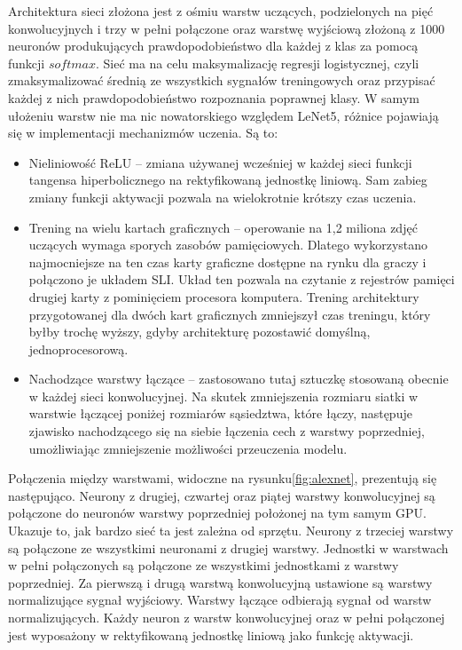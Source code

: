 \documentclass[12pt,a4paper,twoside,titlepage,openright]{book}
\begin{document}
\begin{itemize}
\begin{itemize}
 Architektura sieci złożona jest z ośmiu warstw uczących, podzielonych na pięć konwolucyjnych i trzy w pełni połączone oraz warstwę wyjściową złożoną z 1000 neuronów produkujących prawdopodobieństwo dla każdej z klas za pomocą funkcji $softmax$. Sieć ma na celu maksymalizację regresji logistycznej, czyli zmaksymalizować średnią ze wszystkich sygnałów treningowych oraz przypisać każdej z nich prawdopodobieństwo rozpoznania poprawnej klasy.
  W samym ułożeniu warstw nie ma nic nowatorskiego względem LeNet5, różnice pojawiają się w implementacji mechanizmów uczenia. Są to:
 \begin{itemize}
 \item Nieliniowość ReLU -- zmiana używanej wcześniej w każdej sieci funkcji tangensa hiperbolicznego na rektyfikowaną jednostkę liniową. Sam zabieg zmiany funkcji aktywacji pozwala na wielokrotnie krótszy czas uczenia.
 \item Trening na wielu kartach graficznych -- operowanie na 1,2 miliona zdjęć uczących wymaga sporych zasobów pamięciowych. Dlatego wykorzystano najmocniejsze na ten czas karty graficzne dostępne na rynku dla graczy i połączono je układem SLI. Układ ten pozwala na czytanie z rejestrów pamięci drugiej karty z pominięciem procesora komputera. Trening architektury przygotowanej dla dwóch kart graficznych zmniejszył czas treningu, który byłby trochę wyższy, gdyby architekturę pozostawić domyślną, jednoprocesorową.
 \item Nachodzące warstwy łączące -- zastosowano tutaj sztuczkę stosowaną obecnie w każdej sieci konwolucyjnej. Na skutek zmniejszenia rozmiaru siatki w warstwie łączącej poniżej rozmiarów sąsiedztwa, które łączy, następuje zjawisko nachodzącego się na siebie łączenia cech z warstwy poprzedniej, umożliwiając zmniejszenie możliwości przeuczenia modelu.
 \end{itemize}
 
 Połączenia między warstwami, widoczne na rysunku\ref{fig:alexnet}, prezentują się następująco. Neurony z drugiej, czwartej oraz piątej warstwy konwolucyjnej są połączone do neuronów warstwy poprzedniej położonej na tym samym GPU. Ukazuje to, jak bardzo sieć ta jest zależna od sprzętu. Neurony z trzeciej warstwy są połączone ze wszystkimi neuronami z drugiej warstwy. Jednostki w warstwach w pełni połączonych są połączone ze wszystkimi jednostkami z warstwy poprzedniej. Za pierwszą i drugą warstwą konwolucyjną ustawione są warstwy normalizujące sygnał wyjściowy. Warstwy łączące odbierają sygnał od warstw normalizujących. Każdy neuron z warstw konwolucyjnej oraz w pełni połączonej jest wyposażony w rektyfikowaną jednostkę liniową jako funkcję aktywacji.


\end{itemize}
\end{itemize}
\end{document}
